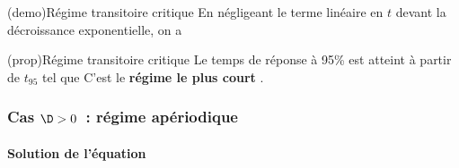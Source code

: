 \documentclass[../../main/main.tex]{subfiles}
\begin{document}
\begin{tcb*}[label=demo:transicrit](demo){Régime transitoire critique}
	En négligeant le terme linéaire en $t$ devant la décroissance
	exponentielle, on a
	\vspace{-15pt}
\end{tcb*}
\begin{tcb*}[label=prop:transicrit, sidebyside]
	(prop){Régime transitoire critique}
	Le temps de réponse à 95\% est atteint à partir de $t_{95}$ tel que
	\vspace{-15pt}
	\tcblower
	C'est le \textbf{régime le plus court }.
\end{tcb*}

\subsubsection{Cas $\D > 0$~: régime apériodique}
\paragraph{Solution de l'équation}
~\smallbreak
\end{document}
